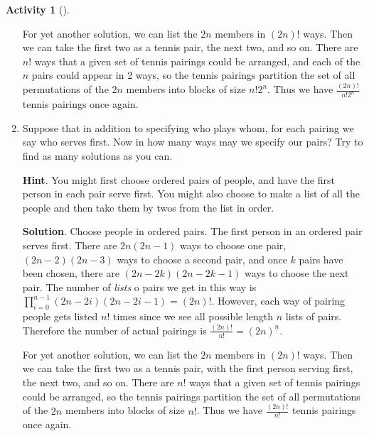 \documentclass[10pt,]{book}
\theoremstyle{plain}
\theoremstyle{definition}
\theoremstyle{definition}
\theoremstyle{definition}
\newtheorem{activity}[project]{Activity}
\theoremstyle{definition}
\numberwithin{equation}{chapter}
\begin{document}
\begin{activity}[]
\begin{enumerate}[font=\bfseries,label=(\alph*),ref=\alph*]
\par
\hypertarget{p-680}{}%
For yet another solution, we can list the \(2n\) members in \((2n)!\) ways. Then we can take the first two as a tennis pair, the next two, and so on. There are \(n!\) ways that a given set of tennis pairings could be arranged, and each of the \(n\) pairs could appear in 2 ways, so the tennis pairings partition the set of all permutations of the \(2n\) members into blocks of size \(n!2^n\). Thus we have \(\frac{(2n)!}{n!2^n}\) tennis pairings once again.%
\item\label{task-77} \hypertarget{p-681}{}%
Suppose that in addition to specifying who plays whom, for each pairing we say who serves first.  Now in how many ways may we specify our pairs? Try to find as many solutions as you can.%
\par\smallskip%
\noindent\textbf{Hint}.\hypertarget{hint-45}{}\quad%
\hypertarget{p-682}{}%
You might first choose ordered pairs of people, and have the first person in each pair serve first. You might also choose to make a list of all the people and then take them by twos from the list in order.%
\par\smallskip%
\noindent\textbf{Solution}.\hypertarget{solution-62}{}\quad%
\hypertarget{p-683}{}%
Choose people in ordered pairs.  The first person in an ordered pair serves first.  There are \(2n(2n-1)\) ways to choose one pair, \((2n-2)(2n-3)\) ways to choose a second pair, and once \(k\) pairs have been chosen, there are \((2n-2k)(2n-2k-1)\) ways to choose the next pair.  The number of \emph{lists} o pairs we get in this way is \(\prod_{i=0}^{n-1} (2n-2i)(2n-2i-1) = (2n)!\). However, each way of pairing people gets listed \(n!\) times since we see all possible length \(n\) lists of pairs.  Therefore the number of actual pairings is \(\frac{(2n)!}{n!} = (2n)^{\underline{n}}\).%
\par
\hypertarget{p-684}{}%
For yet another solution, we can list the \(2n\) members in \((2n)!\) ways. Then we can take the first two as a tennis pair, with the first person serving first, the next two, and so on. There are \(n!\) ways that a given set of tennis pairings could be arranged, so the tennis pairings partition the set of all permutations of the \(2n\) members into blocks of size \(n!\). Thus we have \(\frac{(2n)!}{n!}\) tennis pairings once again.%
\end{enumerate}
\end{activity}
\end{document}
